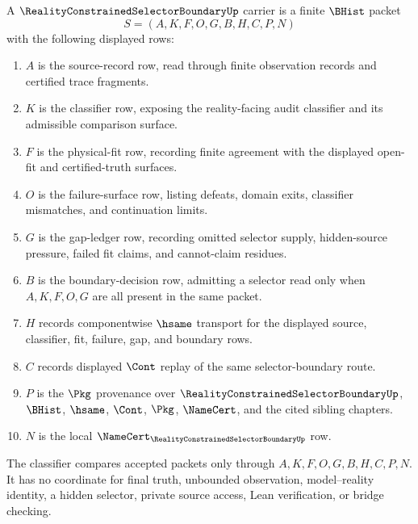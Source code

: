 \begin{definition}
\label{def:reality-constrained-selector-boundary-carrier}
A $\RealityConstrainedSelectorBoundaryUp$ carrier is a finite $\BHist$ packet
$$
S=(A,K,F,O,G,B,H,C,P,N)
$$
with the following displayed rows:
\begin{enumerate}
\item $A$ is the source-record row, read through finite observation records and certified trace fragments.
\item $K$ is the classifier row, exposing the reality-facing audit classifier and its admissible comparison surface.
\item $F$ is the physical-fit row, recording finite agreement with the displayed open-fit and certified-truth surfaces.
\item $O$ is the failure-surface row, listing defeats, domain exits, classifier mismatches, and continuation limits.
\item $G$ is the gap-ledger row, recording omitted selector supply, hidden-source pressure, failed fit claims, and cannot-claim residues.
\item $B$ is the boundary-decision row, admitting a selector read only when $A,K,F,O,G$ are all present in the same packet.
\item $H$ records componentwise $\hsame$ transport for the displayed source, classifier, fit, failure, gap, and boundary rows.
\item $C$ records displayed $\Cont$ replay of the same selector-boundary route.
\item $P$ is the $\Pkg$ provenance over $\RealityConstrainedSelectorBoundaryUp$, $\BHist$, $\hsame$, $\Cont$, $\Pkg$, $\NameCert$, and the cited sibling chapters.
\item $N$ is the local $\NameCert_{\RealityConstrainedSelectorBoundaryUp}$ row.
\end{enumerate}
The classifier compares accepted packets only through $A,K,F,O,G,B,H,C,P,N$. It has no coordinate for final truth, unbounded observation, model--reality identity, a hidden selector, private source access, Lean verification, or bridge checking.
\end{definition}

